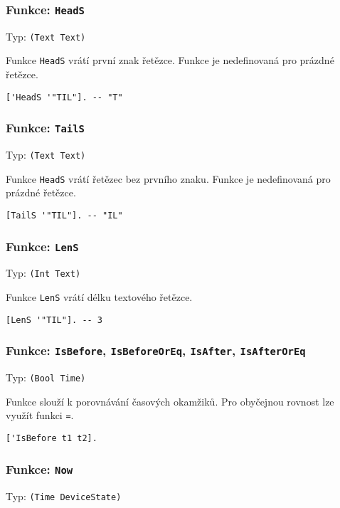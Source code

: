 \subsubsection*{Funkce: \lstinline{HeadS}}
Typ: \lstinline{(Text Text)}

Funkce \lstinline{HeadS} vrátí první znak řetězce. Funkce je nedefinovaná pro prázdné řetězce.

\begin{lstlisting}[caption={Ukázka využití HeadS}]
['HeadS '"TIL"]. -- "T"
\end{lstlisting}

\subsubsection*{Funkce: \lstinline{TailS}}
Typ: \lstinline{(Text Text)}

Funkce \lstinline{HeadS} vrátí řetězec bez prvního znaku. Funkce je nedefinovaná pro prázdné
řetězce.

\begin{lstlisting}[caption={Ukázka využití TailS}]
[TailS '"TIL"]. -- "IL"
\end{lstlisting}

\subsubsection*{Funkce: \lstinline{LenS}}
Typ: \lstinline{(Int Text)}

Funkce \lstinline{LenS} vrátí délku textového řetězce.

\begin{lstlisting}[caption={Ukázka využití LenS}]
[LenS '"TIL"]. -- 3
\end{lstlisting}

\subsubsection*{Funkce: \lstinline{IsBefore}, \lstinline{IsBeforeOrEq}, \lstinline{IsAfter},
  \lstinline{IsAfterOrEq}}
Typ: \lstinline{(Bool Time)}

Funkce slouží k porovnávání časových okamžiků. Pro obyčejnou rovnost lze využít funkci
\lstinline{=}.

\begin{lstlisting}[caption={Ukázka porovnávání časových okamžiků}]
['IsBefore t1 t2].
\end{lstlisting}

\subsubsection*{Funkce: \lstinline{Now}}
Typ: \lstinline{(Time DeviceState)}

